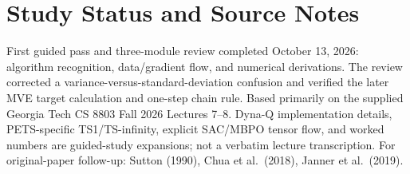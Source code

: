 \section{Study Status and Source Notes}
First guided pass and three-module review completed October 13, 2026: algorithm recognition, data/gradient flow, and numerical derivations. The review corrected a variance-versus-standard-deviation confusion and verified the later MVE target calculation and one-step chain rule. Based primarily on the supplied Georgia Tech CS 8803 Fall 2026 Lectures 7--8. Dyna-Q implementation details, PETS-specific TS1/TS-infinity, explicit SAC/MBPO tensor flow, and worked numbers are guided-study expansions; not a verbatim lecture transcription. For original-paper follow-up: Sutton (1990), Chua et al.\ (2018), Janner et al.\ (2019).

